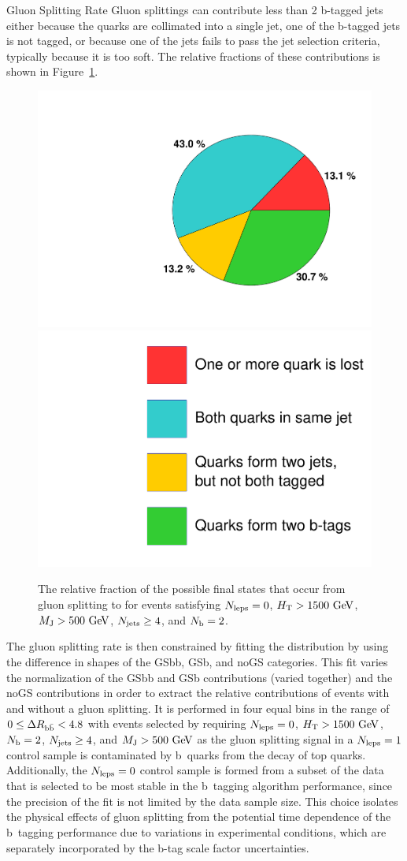 \begin{section}{Gluon Splitting Rate}
Gluon splittings can contribute less than 2 b-tagged jets either because the quarks are collimated into a single jet, one of the b-tagged jets is not tagged, or because one of the jets fails to pass the jet selection criteria, typically because it is too soft.
The relative fractions of these contributions is shown in Figure~\ref{fig:gs_categories}.

\begin{figure}[tbp!]
\begin{center}
\includegraphics[angle=0,width=0.45\columnwidth]{fig/gs_piechart.pdf}
\includegraphics[angle=0,width=0.45\columnwidth]{fig/gs_piechart_legend.pdf}
\end{center}
\caption{The relative fraction of the possible final states that occur from gluon splitting to \bbbar for events satisfying $N_{\mathrm{leps}} = 0$, $H_{\mathrm{T}} > 1500~\mathrm{Ge\kern -0.1em V}$, $M_{\mathrm{J}} > 500~\mathrm{Ge\kern -0.1em V}$, $N_{\mathrm{jets}} \geq 4$, and $N_{\mathrm{b}} = 2$.}
\label{fig:gs_categories}
\end{figure}

The gluon splitting rate is then constrained by fitting the \dRbb distribution by using the difference in shapes of the GSbb, GSb, and noGS categories.
This fit varies the normalization of the GSbb and GSb contributions (varied together) and the noGS contributions in order to extract the relative contributions of events with and without a gluon splitting.
It is performed in four equal bins in the range of $0 \leq \Delta R_{\mathrm{b\bar{b}}} < 4.8$ with events selected by requiring $N_{\mathrm{leps}} = 0$, $H_{\mathrm{T}} > 1500~\mathrm{Ge\kern -0.1em V}$, $N_{\mathrm{b}} = 2$, $N_{\mathrm{jets}} \geq 4$, and $M_{\mathrm{J}} > 500~\mathrm{Ge\kern -0.1em V}$ as the gluon splitting signal in a $N_{\mathrm{leps}} = 1$ control sample is contaminated by b~quarks from the decay of top quarks.
Additionally, the $N_{\mathrm{leps}} = 0$ control sample is formed from a subset of the data that is selected to be most stable in the b~tagging algorithm performance, since the precision of the \dRbb fit is not limited by the data sample size.
This choice isolates the physical effects of gluon splitting from the potential time dependence of the b~tagging performance due to variations in experimental conditions, which are separately incorporated by the b-tag scale factor uncertainties.


\end{section}
